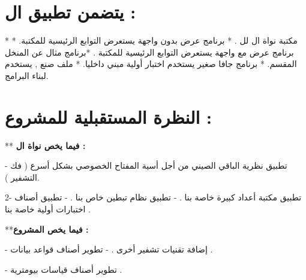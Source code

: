 \documentclass[11pt,a4paper]{report}
\begin{document}
\begin{otherlanguage}{arabic}
\chapter{يتضمن تطبيق ال  :}
\begin{otherlanguage}{arabic}
\begin{center}
* مكتبة نواة ال \textit{}  لل \textit{}.
\newline
* برنامج عرض بدون واجهة يستعرض التوابع الرئيسية للمكتبة.
\newline
* برنامج عرض مع واجهة يستعرض التوابع الرئيسية للمكتبة .
\newline
*برنامج مثال عن المنخل المقسم.
\newline
* برنامج جافا صغير يستخدم اختبار أولية مبني داخليا.
\newline
* ملف صنع , يستخدم لبناء البرامج. 
\end{center}
\end{otherlanguage}
\chapter{النظرة المستقبلية للمشروع :}
\begin{otherlanguage}{arabic}
\begin{center}
\begin{flushleft}
** \textbf{فيما يخص نواة ال  :}
\end{flushleft}
- تطبيق نظرية الباقي الصيني من أجل أسية المفتاح الخصوصي بشكل أسرع             ( فك التشفير ).
\newline

2- تطبيق مكتبة أعداد كبيرة خاصة بنا .
- تطبيق نظام تبطين خاص بنا .
- تطبيق أصناف اختبارات أولية خاصة بنا .
\newline
\begin{flushleft}
**\textbf{فيما يخص المشروع :} 
\end{flushleft} 
- إضافة تقنيات تشفير أخرى .
- تطوير أصناف قواعد بيانات .

- تطوير أصناف قياسات بيومترية .
\end{center}
\end{otherlanguage}


\end{otherlanguage}
\end{document}
